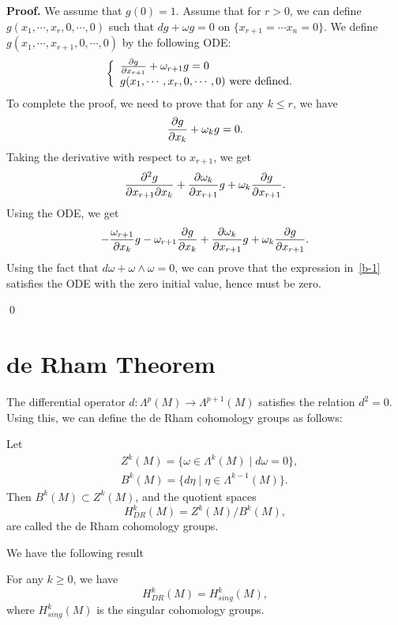 {\bf Proof.} We assume that $g(0)=1$. Assume that for $r>0$, we can define $g(x_1,\cdots,x_r,0,\cdots,0)$ such that $dg+\omega g=0$ on $\{x_{r+1}=\cdots x_n=0\}$. We define $g(x_1,\cdots, x_{r+1},0,\cdots,0)$ by the following ODE:
\[
\left\{
\begin{array}{l}
\frac{\partial g}{\partial x_{r+1}}+\omega_{r+1} g=0\\
g(x_1,\cdots,x_r,0,\cdots,0) \text{ were defined. }
\end{array}
\right.
\]
To complete the proof, we need to prove that for any $k\leq r$, we have
\begin{equation}\label{b-1}
\frac{\partial g}{\partial x_k}+\omega_k g=0.
\end{equation}
Taking the derivative  with respect to $x_{r+1}$, we get
\[
\frac{\partial ^2 g}{\partial x_{r+1}\partial x_k}+\frac{\partial\omega_k}{\partial x_{r+1}}g+\omega_k\frac{\partial g}{\partial x_{r+1}}.
\]
Using the ODE, we get
\[
-\frac{\omega_{r+1}}{\partial x_k}g-\omega_{r+1}\frac{\partial g}{\partial x_k}+\frac{\partial\omega_k}{\partial x_{r+1}}g+\omega_k\frac{\partial g}{\partial x_{r+1}}.
\]
Using the fact that $d\omega+\omega\wedge\omega=0$, we can prove that the expression in~\eqref{b-1} satisfies the ODE with the zero initial value, hence must be zero.

\qed












\section{de Rham Theorem}\label{de-Rham_theorem}

The differential operator $d:\Lambda^p(M)\to\Lambda^{p+1}(M)$ satisfies the relation $d^2=0$. Using this, we can define the de Rham cohomology groups as follows:

\begin{definition}
Let
\begin{align*}
& Z^k(M)=\{\omega\in\Lambda^k(M)\mid d\omega=0\},\\
&B^k(M)=\{d\eta\mid \eta\in\Lambda^{k-1}(M)\}.
\end{align*}
Then $B^k(M)\subset Z^k(M)$, and the quotient spaces
\[
H_{DR}^k(M)=Z^k(M)/B^k(M),
\]
are called the de Rham cohomology groups.
\end{definition}


We have the following result
\begin{theorem}[de Rham] For any 
$k\geq 0$, we have
\[
H_{DR}^k(M)=H_{sing}^k(M),
\]
where $H_{sing}^k(M)$ is the singular cohomology groups.
\end{theorem}

